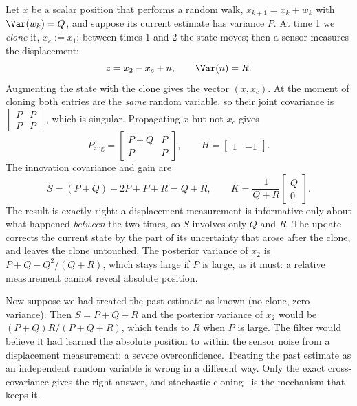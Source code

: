 Let $x$ be a scalar position that performs a random walk, $x_{k+1} = x_k + w_k$ with $\Var(w_k) = Q$, and suppose its
current estimate has variance $P$. At time 1 we \emph{clone} it, $x_c := x_1$; between times 1 and 2 the state moves; then a
sensor measures the displacement:
\begin{equation}
  z = x_2 - x_c + n, \qquad \Var(n) = R .
\end{equation}
Augmenting the state with the clone gives the vector $(x, x_c)$. At the moment of cloning both entries are the \emph{same}
random variable, so their joint covariance is $\begin{bmatrix} P & P \\ P & P\end{bmatrix}$, which is singular. Propagating $x$ but
not $x_c$ gives
\begin{equation}
  P_{\mathrm{aug}} = \begin{bmatrix} P + Q & P \\ P & P \end{bmatrix}, \qquad H = \begin{bmatrix} 1 & -1 \end{bmatrix}.
\end{equation}
The innovation covariance and gain are
\begin{equation}
  S = (P + Q) - 2P + P + R = Q + R, \qquad K = \frac{1}{Q + R}\begin{bmatrix} Q \\ 0 \end{bmatrix}.
\end{equation}
The result is exactly right: a displacement measurement is informative only about what happened \emph{between} the two
times, so $S$ involves only $Q$ and $R$. The update corrects the current state by the part of its uncertainty that arose
after the clone, and leaves the clone untouched. The posterior variance of $x_2$ is $P + Q - Q^2/(Q + R)$, which stays
large if $P$ is large, as it must: a relative measurement cannot reveal absolute position.

Now suppose we had treated the past estimate as known (no clone, zero variance). Then $S = P + Q + R$ and the posterior
variance of $x_2$ would be $(P + Q)R/(P + Q + R)$, which tends to $R$ when $P$ is large. The filter would believe it had
learned the absolute position to within the sensor noise from a displacement measurement: a severe overconfidence.
Treating the past estimate as an independent random variable is wrong in a different way. Only the exact
cross-covariance gives the right answer, and stochastic cloning~\cite{roumeliotis2002cloning} is the mechanism that keeps it.

